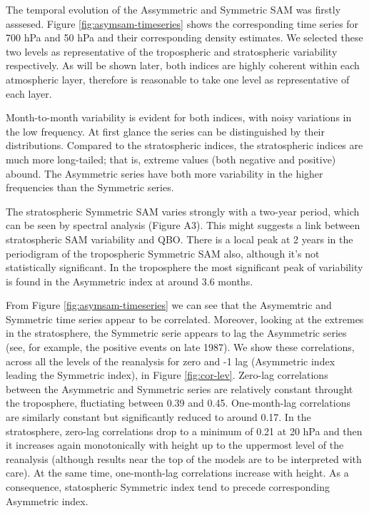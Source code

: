 \documentclass[]{ametsocV5}
\begin{document}
The temporal evolution of the Assymmetric and Symmetric SAM was firstly
asssesed. Figure \ref{fig:asymsam-timeseries} shows the corresponding
time series for 700 hPa and 50 hPa and their corresponding density
estimates. We selected these two levels as representative of the
tropospheric and stratospheric variability respectively. As will be
shown later, both indices are highly coherent within each atmospheric
layer, therefore is reasonable to take one level as representative of
each layer.

Month-to-month variability is evident for both indices, with noisy
variations in the low frequency. At first glance the series can be
distinguished by their distributions. Compared to the stratospheric
indices, the stratospheric indices are much more long-tailed; that is,
extreme values (both negative and positive) abound. The Asymmetric
series have both more variability in the higher frequencies than the
Symmetric series.

The stratospheric Symmetric SAM varies strongly with a two-year period,
which can be seen by spectral analysis (Figure A3). This might suggests
a link between stratospheric SAM variability and QBO. There is a local
peak at 2 years in the periodigram of the tropospheric Symmetric SAM
also, although it's not statistically significant. In the troposphere
the most significant peak of variability is found in the Asymmetric
index at around 3.6 months.

From Figure \ref{fig:asymsam-timeseries} we can see that the Asymemtric
and Symmetric time series appear to be correlated. Moreover, looking at
the extremes in the stratosphere, the Symmetric serie appears to lag the
Asymmetric series (see, for example, the positive events on late 1987).
We show these correlations, across all the levels of the reanalysis for
zero and -1 lag (Asymmetric index leading the Symmetric index), in
Figure \ref{fig:cor-lev}. Zero-lag correlations between the Asymmetric
and Symmetric series are relatively constant throught the troposphere,
fluctiating between 0.39 and 0.45. One-month-lag correlations are
similarly constant but significantly reduced to around 0.17. In the
stratosphere, zero-lag correlations drop to a minimum of 0.21 at 20 hPa
and then it increases again monotonically with height up to the
uppermost level of the reanalysis (although results near the top of the
models are to be interpreted with care). At the same time, one-month-lag
correlations increase with height. As a consequence, statospheric
Symmetric index tend to precede corresponding Asymmetric index.
\end{document}
